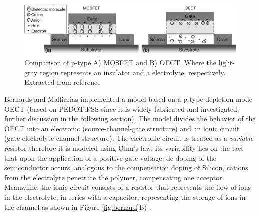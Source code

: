 \begin{figure}[h]
  \centering
  \includegraphics[width=\textwidth]{Images/MOSFETvsOECTs.jpg}
  \caption{Comparison of p-type A) MOSFET and B) OECT. Where the light-gray region represents an insulator and a electrolyte, respectively. Extracted from reference  \cite{friedleinDevicePhysicsOrganic2018}}
  \label{fig:vsMOS}
\end{figure}

Bernards and Malliarias implemented a model based on a p-type depletion-mode OECT (based on PEDOT:PSS since it is widely fabricated and investigated, further discussion in the following section). The model divides the behavior of the OECT into an electronic (source-channel-gate structure) and an ionic circuit (gate-electrolyte-channel structure). The electronic circuit is treated as a \textit{variable} resistor therefore it is modeled using Ohm's law, its variability lies on the fact that upon the application of a positive gate voltage, de-doping of the semiconductor occurs, analogous to the compensation doping of Silicon, cations from the electrolyte penetrate the polymer, compensating one acceptor. Meanwhile, the ionic circuit consists of a resistor that represents the flow of ions in the electrolyte, in series with a capacitor, representing the storage of ions in the channel as shown in Figure \ref{fig:bernard}B) \cite{rivnayOrganicElectrochemicalTransistors2018}\cite{bernardsSteadyStateTransientBehavior2007}. 

